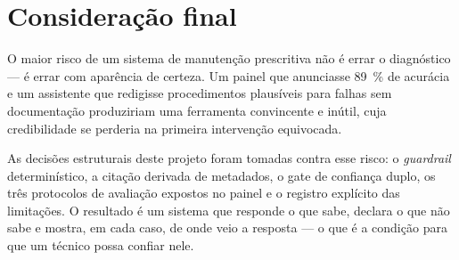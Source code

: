 \section{Consideração final}

O maior risco de um sistema de manutenção prescritiva não é errar o diagnóstico
--- é errar com aparência de certeza. Um painel que anunciasse
\SI{89}{\percent} de acurácia e um assistente que redigisse procedimentos
plausíveis para falhas sem documentação produziriam uma ferramenta convincente e
inútil, cuja credibilidade se perderia na primeira intervenção equivocada.

As decisões estruturais deste projeto foram tomadas contra esse risco: o
\textit{guardrail} determinístico, a citação derivada de metadados, o gate de
confiança duplo, os três protocolos de avaliação expostos no painel e o registro
explícito das limitações. O resultado é um sistema que responde o que sabe,
declara o que não sabe e mostra, em cada caso, de onde veio a resposta ---
o que é a condição para que um técnico possa confiar nele.
